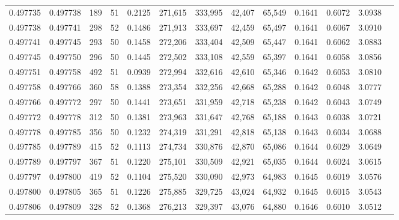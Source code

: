 \begin{tabular}{rrrrrrrrrrrrr}
0.497735 & 0.497738 & 189 &  51 &                                     0.2125 & 271,615 & 333,995 &  42,407 &  65,549 & 0.1641 & 0.6072 & 3.0938 \\
0.497738 & 0.497741 & 298 &  52 &                                     0.1486 & 271,913 & 333,697 &  42,459 &  65,497 & 0.1641 & 0.6067 & 3.0910 \\
0.497741 & 0.497745 & 293 &  50 &                                     0.1458 & 272,206 & 333,404 &  42,509 &  65,447 & 0.1641 & 0.6062 & 3.0883 \\
0.497745 & 0.497750 & 296 &  50 &                                     0.1445 & 272,502 & 333,108 &  42,559 &  65,397 & 0.1641 & 0.6058 & 3.0856 \\
0.497751 & 0.497758 & 492 &  51 &                                     0.0939 & 272,994 & 332,616 &  42,610 &  65,346 & 0.1642 & 0.6053 & 3.0810 \\
0.497758 & 0.497766 & 360 &  58 &                                     0.1388 & 273,354 & 332,256 &  42,668 &  65,288 & 0.1642 & 0.6048 & 3.0777 \\
0.497766 & 0.497772 & 297 &  50 &                                     0.1441 & 273,651 & 331,959 &  42,718 &  65,238 & 0.1642 & 0.6043 & 3.0749 \\
0.497772 & 0.497778 & 312 &  50 &                                     0.1381 & 273,963 & 331,647 &  42,768 &  65,188 & 0.1643 & 0.6038 & 3.0721 \\
0.497778 & 0.497785 & 356 &  50 &                                     0.1232 & 274,319 & 331,291 &  42,818 &  65,138 & 0.1643 & 0.6034 & 3.0688 \\
0.497785 & 0.497789 & 415 &  52 &                                     0.1113 & 274,734 & 330,876 &  42,870 &  65,086 & 0.1644 & 0.6029 & 3.0649 \\
0.497789 & 0.497797 & 367 &  51 &                                     0.1220 & 275,101 & 330,509 &  42,921 &  65,035 & 0.1644 & 0.6024 & 3.0615 \\
0.497797 & 0.497800 & 419 &  52 &                                     0.1104 & 275,520 & 330,090 &  42,973 &  64,983 & 0.1645 & 0.6019 & 3.0576 \\
0.497800 & 0.497805 & 365 &  51 &                                     0.1226 & 275,885 & 329,725 &  43,024 &  64,932 & 0.1645 & 0.6015 & 3.0543 \\
0.497806 & 0.497809 & 328 &  52 &                                     0.1368 & 276,213 & 329,397 &  43,076 &  64,880 & 0.1646 & 0.6010 & 3.0512 \\

\end{tabular}
